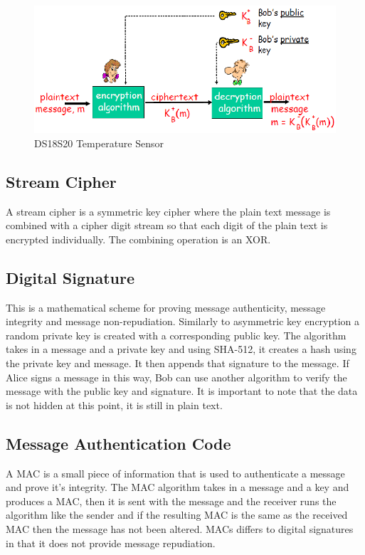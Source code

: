 \begin{figure}[h]
	\centering
	\includegraphics[width=1\linewidth]{Figures/publickeyex.png}
	\caption{DS18S20 Temperature Sensor}
	\label{fig:ds}
\end{figure}


\subsection{Stream Cipher}

A stream cipher is a symmetric key cipher where the plain text message is combined with a cipher digit stream so that each digit of the plain text is encrypted individually. The combining operation is an XOR.

\subsection{Digital Signature}

This is a mathematical scheme for proving message authenticity, message integrity and message non-repudiation. Similarly to asymmetric key encryption a random private key is created with a corresponding public key. The algorithm takes in a message and a private key and using SHA-512, it creates a hash using the private key and message. It then appends that signature to the message. If Alice signs a message in this way, Bob can use another algorithm to verify the message with the public key and signature. It is important to note that the data is not hidden at this point, it is still in plain text.

\subsection{Message Authentication Code}

A MAC is a small piece of information that is used to authenticate a message and prove it's integrity. The MAC algorithm takes in a message and a key and produces a MAC, then it is sent with the message and the receiver runs the algorithm like the sender and if the resulting MAC is the same as the received MAC then the message has not been altered. MACs differs to digital signatures in that it does not provide message repudiation.

